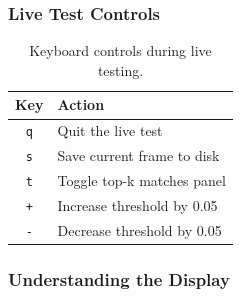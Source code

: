 \documentclass[11pt,a4paper]{article}
\begin{document}
\subsubsection{Live Test Controls}

\begin{table}[H]
    \centering
    \begin{tabular}{cl}
        \toprule
        \textbf{Key} & \textbf{Action} \\
        \midrule
        \texttt{q} & Quit the live test \\
        \texttt{s} & Save current frame to disk \\
        \texttt{t} & Toggle top-k matches panel \\
        \texttt{+} & Increase threshold by 0.05 \\
        \texttt{-} & Decrease threshold by 0.05 \\
        \bottomrule
    \end{tabular}
    \caption{Keyboard controls during live testing.}
\end{table}

\subsubsection{Understanding the Display}
\end{document}
